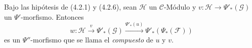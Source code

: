 \begin{env}[4.4.2]
\label{0.4.4.2-fr}
Bajo las hipótesis de (4.2.1) y (4.2.6), sean $\mathcal{H}$ un
$\mathcal{C}$-Módulo y $v:\mathcal{H}\to\Psi'_*(\mathcal{G})$ un
$\Psi'$-morfismo. Entonces
\[
  w:\mathcal{H}\xrightarrow{v}\Psi'_*(\mathcal{G})
  \xrightarrow{\Psi'_*(u)}\Psi'_*(\Psi_*(\mathcal{F}))
\]
es un $\Psi''$-morfismo que se llama el \emph{compuesto} de $u$ y $v$.
\end{env}

